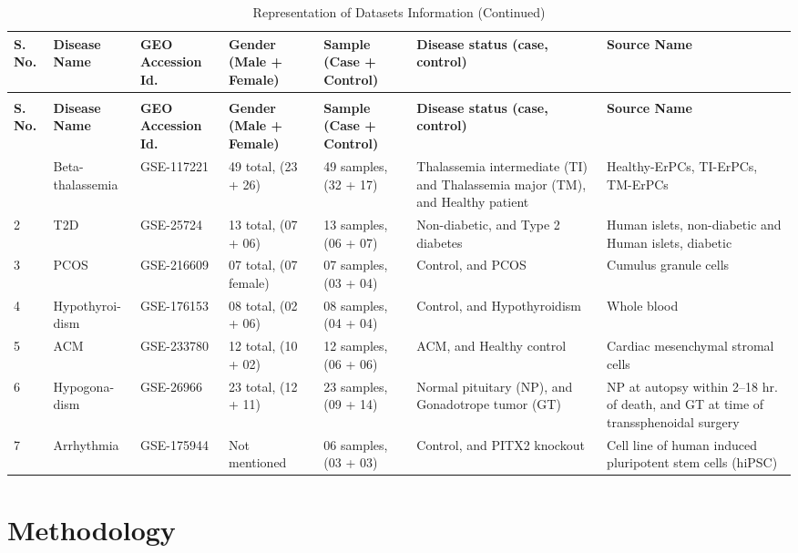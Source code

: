\vspace*{-\parskip} %
\begin{longtable}{|p{0.5cm}|p{2.0cm}|p{1.4cm}|p{1.8cm}|p{2.0cm}|p{2.3cm}|p{2.0cm}|}
\caption{Representation of Datasets Information} \label{tab:3.1} \\
\hline
\textbf{S. No.} & \textbf{Disease Name} & \textbf{GEO Accession Id.} & \textbf{Gender (Male + Female)} & \textbf{Sample (Case + Control)} & \textbf{Disease status (case, control)} & \textbf{Source Name} \\
\hline
\endfirsthead
\caption[]{Representation of Datasets Information (Continued)} \\
\hline
\textbf{S. No.} & \textbf{Disease Name} & \textbf{GEO Accession Id.} & \textbf{Gender (Male + Female)} & \textbf{Sample (Case + Control)} & \textbf{Disease status (case, control)} & \textbf{Source Name} \\
\hline
\endhead
\hline
\endfoot
1 & Beta-thalassemia & GSE-117221 & 49 total, (23 + 26) & 49 samples, (32 + 17) & Thalassemia intermediate (TI) and Thalassemia major (TM), and Healthy patient & Healthy-ErPCs, TI-ErPCs, TM-ErPCs \\
\hline
2 & T2D & GSE-25724 & 13 total, (07 + 06) & 13 samples, (06 + 07) & Non-diabetic, and Type 2 diabetes & Human islets, non-diabetic and Human islets, diabetic \\
\hline
3 & PCOS & GSE-216609 & 07 total, (07 female) & 07 samples, (03 + 04) & Control, and PCOS & Cumulus granule cells \\
\hline
4 & Hypothyroi-dism & GSE-176153 & 08 total, (02 + 06) & 08 samples, (04 + 04) & Control, and Hypothyroidism & Whole blood \\
\hline
5 & ACM & GSE-233780 & 12 total, (10 + 02) & 12 samples, (06 + 06) & ACM, and Healthy control & Cardiac mesenchymal stromal cells \\
\hline
6 & Hypogona-dism & GSE-26966 & 23 total, (12 + 11) & 23 samples, (09 + 14) & Normal pituitary (NP), and Gonadotrope tumor (GT) & NP at autopsy within 2--18 hr. of death, and GT at time of transsphenoidal surgery \\
\hline
7 & Arrhythmia & GSE-175944 & Not mentioned & 06 samples, (03 + 03) & Control, and PITX2 knockout & Cell line of human induced pluripotent stem cells (hiPSC) \\
\hline
\end{longtable}


\newpage
\section{Methodology}
\label{sec:sec3_4}

